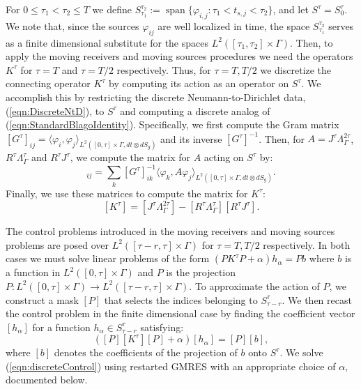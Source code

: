 \documentclass[final,leqno]{siamart1116}
\begin{document}
For $0 \leq \tau_1 < \tau_2 \leq T$ we define $S_{\tau_1}^{\tau_2} :=
\operatorname{span}\{\varphi_{i,j} : \tau_1 < t_{s,j} < \tau_2\}$, and let
$S^{\tau} = S_0^{\tau}$.  We note that, since the sources
$\varphi_{ij}$ are well localized in time, the space
$S_{\tau_1}^{\tau_2}$ serves as a finite dimensional substitute for
the spaces $L^2([\tau_1,\tau_2] \times \Gamma)$. Then, to apply the
moving receivers and moving sources procedures we need the operators
$K^\tau$ for $\tau = T$ and $\tau = T/2$ respectively. Thus, for $\tau
= T, T/2$ we discretize the connecting operator $K^{\tau}$ by
computing its action as an operator on $S^\tau$.  We accomplish this
by restricting the discrete Neumann-to-Dirichlet data,
(\ref{eqn:DiscreteNtD}), to $S^\tau$ and computing a discrete analog
of (\ref{eqn:StandardBlagoIdentity}). Specifically, we first compute
the Gram matrix $[G^\tau]_{ij} = \langle \varphi_i,\varphi_j
\rangle_{L^2([0,\tau]\times\Gamma, {dt\otimes{dS_g}})}$ and its inverse
$[G^{\tau}]^{-1}$. Then, for $A = J^\tau \Lambda_{\Gamma}^{2\tau}$,
$R^\tau\Lambda_{\Gamma}^{\tau}$ and $R^\tau J^\tau$, we compute the
matrix for $A$ acting on $S^\tau$ by:
\begin{equation*}
  [A]_{ij} = \sum_k [G^{\tau}]^{-1}_{ik} \langle\varphi_k, A
  \varphi_j\rangle_{L^2([0,\tau]\times\Gamma, {dt\otimes{dS_g}})}.
\end{equation*}
Finally, we use these matrices to compute the matrix for $K^\tau$:
\begin{equation}
  \label{eqn:discreteBlago}
  [K^\tau] = [J^\tau \Lambda_{\Gamma}^{2\tau}] - [R^\tau \Lambda_{\Gamma}^{\tau}] [R^\tau J^\tau].
\end{equation}

The control problems introduced in the moving receivers and moving
sources problems are posed over $L^2([\tau -r, \tau] \times \Gamma)$
for $\tau = T,T/2$ respectively. In both cases we must solve linear
problems of the form $(PK^\tau P + \alpha) h_\alpha = Pb$ where $b$ is
a function in $L^2([0,\tau] \times \Gamma)$ and $P$ is the projection
$P : L^2([0,\tau] \times \Gamma) \rightarrow L^2([\tau-r,\tau] \times
\Gamma)$. To approximate the action of $P$, we construct a mask $[P]$
that selects the indices belonging to $S_{\tau-r}^\tau$. We then
recast the control problem in the finite dimensional case by finding
the coefficient vector $[h_\alpha]$ for a function $h_\alpha \in
S_{\tau-r}^\tau$ satisfying:
\begin{equation}
  \label{eqn:discreteControl}
  ([P][K^\tau][P] + \alpha) [h_\alpha] = [P][b],
\end{equation}
where $[b]$ denotes the coefficients of the projection of $b$ onto
$S^{\tau}$. We solve (\ref{eqn:discreteControl}) using restarted GMRES
with an appropriate choice of $\alpha$, documented below.
\end{document}
